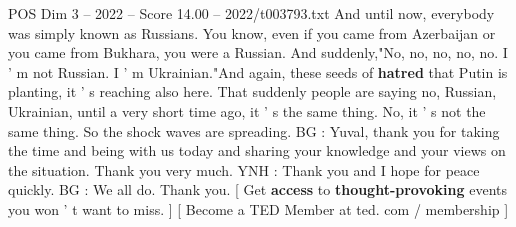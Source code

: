 \begin{textsample}{POS Dim 3 – 2022 – Score 14.00 – 2022/t003793.txt}
And until now, everybody was simply known as Russians.
You know, even if you came from Azerbaijan or you came from Bukhara, you were a Russian.
And suddenly,"No, no, no, no, no.
I ' m not Russian.
I ' m Ukrainian."And again, these seeds of \textbf{hatred} that Putin is planting, it ' s reaching also here.
That suddenly people are saying no, Russian, Ukrainian, until a very short time ago, it ' s the same thing.
No, it ' s not the same thing.
So the shock waves are spreading.
BG : Yuval, thank you for taking the time and being with us today and sharing your knowledge and your views on the situation.
Thank you very much.
YNH : Thank you and I hope for peace quickly.
BG : We all do.
Thank you. [ Get \textbf{access} to \textbf{thought-provoking} events you won ' t want to miss. ] [ Become a TED Member at ted. com / membership ]

\end{textsample}
